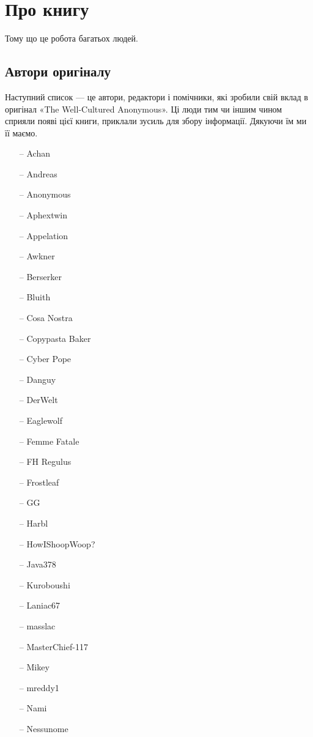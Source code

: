 \newpage
\tableofcontents

\chapter*{Про книгу}
Тому що це робота багатьох людей.

\section*{Автори оригіналу}
Наступний список — це автори, редактори і помічники, які зробили свій вклад
в оригінал «The Well-Cultured Anonymous». Ці люди тим чи іншим чином
сприяли появі цієї книги, приклали зусиль для збору інформації. Дякуючи їм
ми її маємо.

\begin{multicols}{3}
\begin{itemize}
	\item[--] Achan
	\item[--] Andreas
	\item[--] Anonymous
	\item[--] Aphextwin
	\item[--] Appelation
	\item[--] Awkner
	\item[--] Berserker
	\item[--] Bluith
	\item[--] Cosa Nostra
	\item[--] Copypasta Baker
	\item[--] Cyber Pope
	\item[--] Danguy
	\item[--] DerWelt
	\item[--] Eaglewolf
	\item[--] Femme Fatale
	\item[--] FH Regulus
	\item[--] Frostleaf
	\item[--] GG
	\item[--] Harbl
	\item[--] HowIShoopWoop?
	\item[--] Java378
	\item[--] Kuroboushi
	\item[--] Laniac67
	\item[--] masslac
	\item[--] MasterChief-117
	\item[--] Mikey
	\item[--] mreddy1
	\item[--] Nami
	\item[--] Nessunome

\end{itemize}
\end{multicols}
